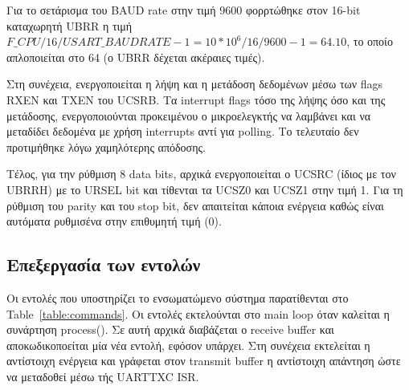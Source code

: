 \documentclass[a4paper,12pt]{article}
\begin{document}
Για το σετάρισμα του BAUD rate στην τιμή 9600 φορρτώθηκε στον 16-bit καταχωρητή UBRR η τιμή $F\_CPU/16/USART\_BAUDRATE - 1  = 10 * 10^6 / 16 / 9600 - 1 = 64.10$, το οποίο απλοποιείται στο 64 (ο UBRR δέχεται ακέραιες τιμές).

Στη συνέχεια, ενεργοποιείται η λήψη και η μετάδοση δεδομένων μέσω των flags RXEN και TXEN του UCSRB. Τα interrupt flags τόσο της λήψης όσο και της μετάδοσης, ενεργοποιούνται προκειμένου ο μικροελεγκτής να λαμβάνει και να μεταδίδει δεδομένα με χρήση interrupts αντί για polling. Το τελευταίο δεν προτιμήθηκε λόγω χαμηλότερης απόδοσης.

Τέλος, για την ρύθμιση 8 data bits, αρχικά ενεργοποιείται ο UCSRC (ίδιος με τον UBRRH) με το URSEL bit και τίθενται τα UCSZ0 και UCSZ1 στην τιμή 1. Για τη ρύθμιση του parity και του stop bit, δεν απαιτείται κάποια ενέργεια καθώς είναι αυτόματα ρυθμισένα στην επιθυμητή τιμή (0).


% 

\subsection{Επεξεργασία των εντολών}
Οι εντολές που υποστηρίζει το ενσωματώμενο σύστημα παρατίθενται στο Table~\ref{table:commands}. Οι εντολές εκτελούνται στο main loop όταν καλείται η συνάρτηση process(). Σε αυτή αρχικά διαβάζεται ο receive buffer και αποκωδικοποείται μία νέα εντολή, εφόσον υπάρχει. Στη συνέχεια εκτελείται η αντίστοιχη ενέργεια και γράφεται στον transmit buffer η αντίστοιχη απάντηση ώστε να μεταδοθεί μέσω τής UART\textunderscore TXC ISR.
\end{document}
